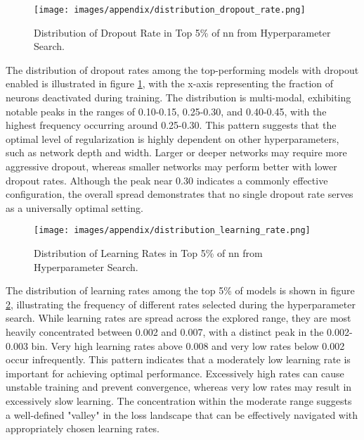 \begin{figure}[H]
	\centering
	\texttt{[image: images/appendix/distribution\_dropout\_rate.png]}
	\caption{Distribution of Dropout Rate in Top 5\% of \ac{nn} from Hyperparameter Search.}
	\label{fig:distribution_dropout}
\end{figure}
The distribution of dropout rates among the top-performing models with dropout enabled is illustrated in figure \ref{fig:distribution_dropout}, with the x-axis representing the fraction of neurons deactivated during training. The distribution is multi-modal, exhibiting notable peaks in the ranges of 0.10-0.15, 0.25-0.30, and 0.40-0.45, with the highest frequency occurring around 0.25-0.30. This pattern suggests that the optimal level of regularization is highly dependent on other hyperparameters, such as network depth and width. Larger or deeper networks may require more aggressive dropout, whereas smaller networks may perform better with lower dropout rates. Although the peak near 0.30 indicates a commonly effective configuration, the overall spread demonstrates that no single dropout rate serves as a universally optimal setting.

\begin{figure}[H]
	\centering
	\texttt{[image: images/appendix/distribution\_learning\_rate.png]}
	\caption{Distribution of Learning Rates in Top 5\% of \ac{nn} from Hyperparameter Search.}
	\label{fig:distribution_learning_rate}
\end{figure}
The distribution of learning rates among the top 5\% of models is shown in figure \ref{fig:distribution_learning_rate}, illustrating the frequency of different rates selected during the hyperparameter search. While learning rates are spread across the explored range, they are most heavily concentrated between 0.002 and 0.007, with a distinct peak in the 0.002-0.003 bin. Very high learning rates above 0.008 and very low rates below 0.002 occur infrequently. This pattern indicates that a moderately low learning rate is important for achieving optimal performance. Excessively high rates can cause unstable training and prevent convergence, whereas very low rates may result in excessively slow learning. The concentration within the moderate range suggests a well-defined "valley" in the loss landscape that can be effectively navigated with appropriately chosen learning rates.

